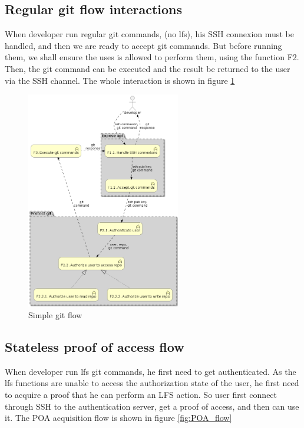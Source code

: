 \newpage
\subsection{Regular git flow interactions}

When developer run regular git commands, (no lfs), his SSH connexion must be handled, and then we are ready to accept git commands. But before running them, we shall ensure the uses is allowed to perform them, using the function F2. Then, the git command can be executed and the result be returned to the user via the SSH channel. The whole interaction is shown in figure \ref{fig:simple_git_flow}

\begin{figure}[ht]
    \centering
    \includegraphics[width=0.6\textwidth]{iteration_00/diagrams/simple_git_flow.png}
    \caption{Simple git flow}
    \label{fig:simple_git_flow}
\end{figure}

\newpage
\subsection{Stateless proof of access flow}

When developer run lfs git commands, he first need to get authenticated. As the lfs functions are unable to access the authorization state of the user, he first need to acquire a proof that he can perform an LFS action. So user first connect through SSH to the authentication server, get a proof of access, and then can use it. The POA acquisition flow is shown in figure \ref{fig:POA_flow}

